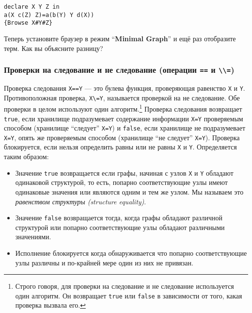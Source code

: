 \begin{lstlisting}
declare X Y Z in
a(X c(Z) Z)=a(b(Y) Y d(X))
{Browse X#Y#Z}
\end{lstlisting}

Теперь установите браузер в режим ``\textbf{Minimal Graph}'' и ещё раз отобразите терм. Как вы объясните разницу?

\subsubsection{Проверки на следование и не следование (операции \lstinline!==! и \lstinline!\\=!)}

Проверка следования \lstinline!X==Y! --- это булева функция, проверяющая равенство \lstinline!X! и \lstinline!Y!. Противоположная проверка, \lstinline!X\=Y!, называется проверкой на не следование. Обе проверки в целом используют один алгоритм.\footnote{Строго говоря, для проверки на следование и не следование используется один алгоритм. Он возвращает \lstinline!true! или \lstinline!false! в зависимости от того, какая проверка вызвала его.} Проверка следования возвращает \lstinline!true!, если хранилище подразумевает содержание информации \lstinline!X=Y! проверяемым способом (хранилище ``следует'' \lstinline!X=Y!) и \lstinline!false!, если хранилище не подразумевает \lstinline!X=Y!, опять же проверяемым способом (хранилище ``не следует'' \lstinline!X=Y!). Проверка блокируется, если нельзя определить равны или не равны \lstinline!X! и \lstinline!Y!. Определяется таким образом:

\begin{itemize}

\item{Значение \lstinline!true! возвращается если графы, начиная с узлов \lstinline!X! и \lstinline!Y! обладают одинаковой структурой, то есть, попарно соответствующие узлы имеют одинаковые значения или являются одним и тем же узлом. Мы называем это \emph{равенством структуры (structure equality)}.}

\item{Значение \lstinline!false! возвращается тогда, когда графы обладают различной структурой или попарно соответствующие узлы обладают различными значениями.}

\item{Исполнение блокируется когда обнаруживается что попарно соответствующие узлы различны и по-крайней мере один из них не привязан.}
\end{itemize}

